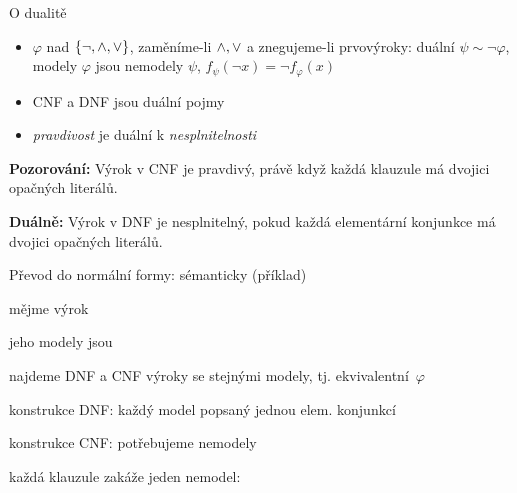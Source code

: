 \documentclass{beamer}
\begin{document}
\begin{frame}{O dualitě}

    \vspace{-12pt}

    \pause
    \begin{itemize}
        \item $\varphi$ nad $\{\neg,{\land},{\lor}\}$, zaměníme-li ${\land},{\lor}$ a znegujeme-li prvovýroky: \alert{duální} $\psi\sim\neg\varphi$, modely $\varphi$ jsou nemodely $\psi$, $f_\psi(\neg x)=\neg f_\varphi(x)$
        \item CNF a DNF jsou duální pojmy
        \item \emph{pravdivost} je duální k \emph{nesplnitelnosti} 
    \end{itemize}

    \pause
    \textbf{Pozorování:} Výrok v CNF je \alert{pravdivý}, právě když každá klauzule má dvojici opačných literálů.

    \pause
    \textbf{Duálně:} Výrok v DNF je \alert{nesplnitelný}, pokud každá elementární konjunkce má dvojici opačných literálů.
       
\end{frame}


\begin{frame}{Převod do normální formy: sémanticky (příklad)}

    mějme výrok 

    jeho modely jsou 

    najdeme DNF a CNF výroky se stejnými modely, tj. ekvivalentní~$\varphi$

    \pause
    \bigskip

    \alert{konstrukce DNF:} každý model popsaný jednou elem. konjunkcí

    \pause
    \bigskip

    \alert{konstrukce CNF:} potřebujeme \alert{nemodely}

    \pause
    každá klauzule zakáže jeden nemodel: 

\end{frame}
\end{document}
